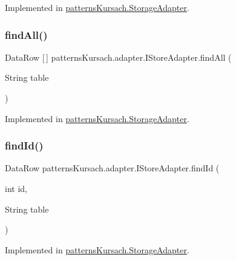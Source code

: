 Implemented in \mbox{\hyperlink{classpatterns_kursach_1_1_storage_adapter_abb78e8f3b4afc32f724141fd36cf3bfb}{patterns\+Kursach.\+Storage\+Adapter}}.

\mbox{\label{interfacepatterns_kursach_1_1adapter_1_1_i_store_adapter_a13f0beab6001c24e72b16d3afa1c5f7a}} 
\subsubsection{\texorpdfstring{find\+All()}{findAll()}}
{\footnotesize\ttfamily Data\+Row \mbox{[}$\,$\mbox{]} patterns\+Kursach.\+adapter.\+I\+Store\+Adapter.\+find\+All (\begin{DoxyParamCaption}\item[{String}]{table }\end{DoxyParamCaption})}



Implemented in \mbox{\hyperlink{classpatterns_kursach_1_1_storage_adapter_a08e1b401021fac85dfd2f22a8654171a}{patterns\+Kursach.\+Storage\+Adapter}}.

\mbox{\label{interfacepatterns_kursach_1_1adapter_1_1_i_store_adapter_a23ec87fad2ed69f4aeb2cc98369dfcc0}} 
\subsubsection{\texorpdfstring{find\+Id()}{findId()}}
{\footnotesize\ttfamily Data\+Row patterns\+Kursach.\+adapter.\+I\+Store\+Adapter.\+find\+Id (\begin{DoxyParamCaption}\item[{int}]{id,  }\item[{String}]{table }\end{DoxyParamCaption})}



Implemented in \mbox{\hyperlink{classpatterns_kursach_1_1_storage_adapter_a6b1e7c2a228f04ef4708702a8e11f114}{patterns\+Kursach.\+Storage\+Adapter}}.

